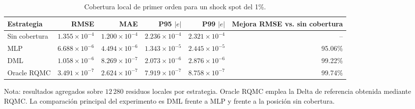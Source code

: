 \begin{table}[htbp]
\centering
\caption{Cobertura local de primer orden para un shock spot del 1\%.}
\label{tab:local_hedge_1pct}
\small
\begin{tabular}{lrrrrr}
\toprule
Estrategia & RMSE & MAE & P95 $|e|$ & P99 $|e|$ & Mejora RMSE vs. sin cobertura \\
\midrule
Sin cobertura & $1.355\times 10^{-4}$ & $1.200\times 10^{-4}$ & $2.236\times 10^{-4}$ & $2.321\times 10^{-4}$ & -- \\
MLP & $6.688\times 10^{-6}$ & $4.494\times 10^{-6}$ & $1.343\times 10^{-5}$ & $2.445\times 10^{-5}$ & 95.06\% \\
DML & $1.058\times 10^{-6}$ & $8.269\times 10^{-7}$ & $2.073\times 10^{-6}$ & $2.876\times 10^{-6}$ & 99.22\% \\
Oracle RQMC & $3.491\times 10^{-7}$ & $2.624\times 10^{-7}$ & $7.919\times 10^{-7}$ & $8.758\times 10^{-7}$ & 99.74\% \\
\bottomrule
\end{tabular}
\begin{flushleft}
\footnotesize
Nota: resultados agregados sobre $12\,280$ residuos locales por estrategia. Oracle RQMC emplea la Delta de referencia obtenida mediante RQMC.
La comparación principal del experimento es DML frente a MLP y frente a la posición sin cobertura.
\end{flushleft}
\end{table}
